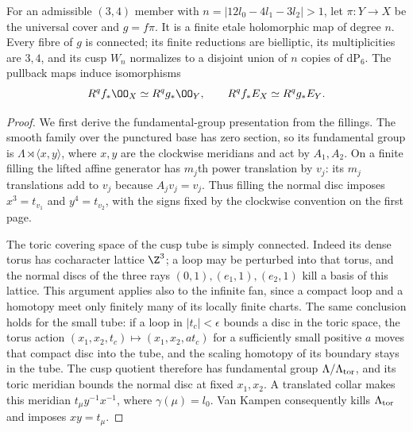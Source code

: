 \begin{proposition}\label{inv:B3.1}
For an admissible $(3,4)$ member with
$n=|12l_0-4l_1-3l_2|>1$, let $\pi:Y\to X$ be the universal
cover and $g=f\pi$. It is a finite etale holomorphic map of degree $n$.
Every fibre of $g$ is connected; its finite reductions are bielliptic,
its multiplicities are $3,4$, and its cusp $W_n$ normalizes to a
disjoint union of $n$ copies of $\mathrm{dP}_6$.
The pullback maps induce isomorphisms
\[
R^qf_*\OO_X\simeq R^qg_*\OO_Y,\qquad
R^qf_*E_X\simeq R^qg_*E_Y.
\]
\end{proposition}
\begin{proof}
We first derive the fundamental-group presentation from the fillings.
The smooth family over the punctured base has zero section, so its
fundamental group is $\Lambda\rtimes\langle x,y\rangle$, where
$x,y$ are the clockwise meridians and act by $A_1,A_2$.
On a finite filling the lifted affine generator has $m_j$th power
translation by $v_j$: its $m_j$ translations add to $v_j$ because
$A_jv_j=v_j$. Thus filling the normal disc imposes
$x^3=t_{v_1}$ and $y^4=t_{v_2}$, with the signs fixed by the
clockwise convention on the first page.

The toric covering space of the cusp tube is simply connected.
Indeed its dense torus has cocharacter lattice $\Z^3$; a loop may
be perturbed into that torus, and the normal discs of the three rays
$(0,1),(e_1,1),(e_2,1)$ kill a basis of this lattice.
This argument applies also to the infinite fan, since a compact loop
and a homotopy meet only finitely many of its locally finite charts.
The same conclusion holds for the small tube: if a loop in
$|t_c|<\epsilon$ bounds a disc in the toric space, the torus action
$(x_1,x_2,t_c)\mapsto(x_1,x_2,a t_c)$ for a sufficiently small
positive $a$ moves that compact disc into the tube, and the scaling
homotopy of its boundary stays in the tube.
The cusp quotient therefore has fundamental group
$\Lambda/\Lambda_{\rm tor}$, and its toric meridian bounds the
normal disc at fixed $x_1,x_2$. A translated collar makes this
meridian $t_\mu y^{-1}x^{-1}$, where $\gamma(\mu)=l_0$.
Van Kampen consequently kills $\Lambda_{\rm tor}$ and imposes
$xy=t_\mu$.


\end{proof}
